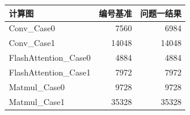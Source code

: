 \begin{tabular}{lrr}\toprule 计算图 & 编号基准 & 问题一结果\\\midrule
Conv\_Case0 & 7560 & 6984 \\
Conv\_Case1 & 14048 & 14048 \\
FlashAttention\_Case0 & 4884 & 4884 \\
FlashAttention\_Case1 & 7972 & 7972 \\
Matmul\_Case0 & 9728 & 9728 \\
Matmul\_Case1 & 35328 & 35328 \\
\bottomrule\end{tabular}
